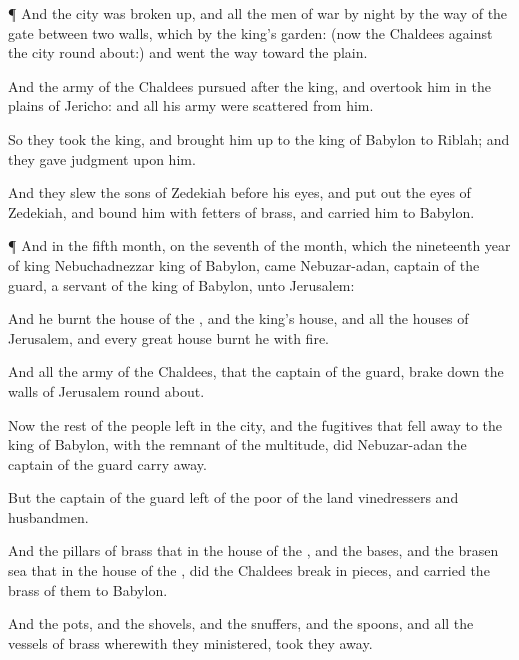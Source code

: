 {\par }{\PP {}¶ And the
city was broken
up, and all the
men of
war
{} by
night by the
way of the
gate between two
walls, which
{} by the
king’s
garden: (now the
Chaldees
{} against the
city round
about:) and
{}
went the
way toward the
plain.

And the
army of the
Chaldees
pursued
after the
king, and
overtook him in the
plains of
Jericho: and all his
army were
scattered from him.

So they
took the
king, and brought him
up to the
king of
Babylon to
Riblah; and they
gave
judgment upon him.

And they
slew the
sons of
Zedekiah before his
eyes, and put
out the
eyes of
Zedekiah, and
bound him with
fetters of
brass, and
carried him to
Babylon.


\par }{\PP {}¶ And in the
fifth
month, on the
seventh
{} of the
month, which
{} the
nineteenth
year of
king
Nebuchadnezzar
king of
Babylon,
came
Nebuzar-adan,
captain of the
guard, a
servant of the
king of
Babylon, unto
Jerusalem:

And he
burnt the
house of the
{}, and the
king’s
house, and all the
houses of
Jerusalem, and every
great
{}
house
burnt he with
fire.

And all the
army of the
Chaldees, that
{} the
captain of the
guard, brake
down the
walls of
Jerusalem round
about.

Now the
rest of the
people
{}
left in the
city, and the
fugitives that fell
away to the
king of
Babylon, with the
remnant of the
multitude, did
Nebuzar-adan the
captain of the
guard carry
away.

But the
captain of the
guard
left of the
poor of the
land
{}
vinedressers and
husbandmen.

And the
pillars of
brass that
{} in the
house of the
{}, and the
bases, and the
brasen
sea that
{} in the
house of the
{}, did the
Chaldees break in
pieces, and
carried the
brass of them to
Babylon.

And the
pots, and the
shovels, and the
snuffers, and the
spoons, and all the
vessels of
brass wherewith they
ministered, took they
away.

}
